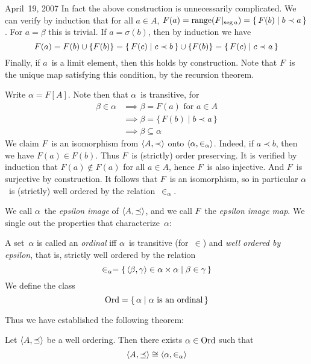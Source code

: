 \begin{lecture}{April~19, 2007}
In fact the above construction is unnecessarily complicated. We can verify by induction that for all \(a\in A\), \(F(a)=\operatorname{range}(F|_{\operatorname{seg} a})=\{\,F(b)\mid b\prec a\,\}\). For \(a=\beta\) this is trivial. If \(a=\sigma(b)\), then by induction we have
\[F(a)=F(b)\cup\{F(b)\}=\{\,F(c)\mid c\prec b\,\}\cup\{F(b)\}=\{\,F(c)\mid c\prec a\,\}\]
Finally, if \(a\)~is a limit element, then this holds by construction. Note that \(F\)~is the unique map satisfying this condition, by the recursion theorem.

Write \(\alpha=F[A]\). Note then that \(\alpha\)~is transitive, for
\begin{align*}
\beta\in\alpha&\implies \beta=F(a)\text{ for }a\in A\\
	&\implies \beta=\{\,F(b)\mid b\prec a\,\}\\
	&\implies \beta\subseteq\alpha
\end{align*}
We claim \(F\)~is an isomorphism from \(\langle{A},{\prec}\rangle\) onto \(\langle{\alpha},{\in_{\alpha}}\rangle\). Indeed, if \(a\prec b\), then we have \(F(a)\in F(b)\). Thus \(F\)~is (strictly) order preserving. It is verified by induction that \(F(a)\not\in F(a)\) for all \(a\in A\), hence \(F\)~is also injective. And \(F\)~is surjective by construction. It follows that \(F\)~is an isomorphism, so in particular \(\alpha\)~is (strictly) well ordered by the relation~\(\in_{\alpha}\).

We call \(\alpha\)~the \emph{epsilon image} of \(\langle{A},{\preceq}\rangle\), and we call \(F\)~the \emph{epsilon image map}. We single out the properties that characterize~\(\alpha\):
\begin{defn}
A set~\(\alpha\) is called an \emph{ordinal} iff \(\alpha\)~is transitive (for~\(\in\)) and \emph{well ordered by epsilon}, that is, strictly well ordered by the relation
\[\in_{\alpha}=\{\,\langle{\beta},{\gamma}\rangle\in\alpha\times\alpha\mid \beta\in\gamma\,\}\]
We define the class
\[\mathrm{Ord}=\{\,\alpha\mid \alpha\text{ is an ordinal}\,\}\]
\end{defn}
Thus we have established the following theorem:
\begin{thm}
Let \(\langle{A},{\preceq}\rangle\) be a well ordering. Then there exists \(\alpha\in\mathrm{Ord}\) such that
\[\langle{A},{\preceq}\rangle\cong\langle{\alpha},{\in_{\alpha}}\rangle\]
\end{thm}
\end{lecture}

